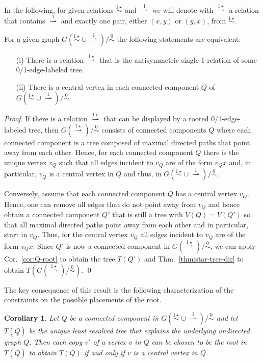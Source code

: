 \documentclass[smallextended]{svjour3}
\newcommand{\Ro}{\mathrel{\overset{0}{\sim}}}
\newcommand{\Rlstar}{\mathrel{\overset{1\star}{\sim}}}
\newcommand{\Rldstar}{\mathrel{\overset{1\star}{\rightharpoonup}}}
\newcommand{\Rld}{\mathrel{\overset{1}{\rightharpoonup}}}
\newtheorem{cor}[thm]{Corollary}
\begin{document}
In the following, for given relations $\Rlstar$ and $\Rld$ we will denote
with $\Rldstar$ a relation that contains $\Rld$ and exactly one pair,
either $(x,y)$ or $(y,x)$, from $\Rlstar$.

\begin{lemma}
  For a given graph $G(\Rlstar\cup\Rld)/\Ro$ the following statements
  are equivalent:
  \begin{itemize}
  \item[(i)] There is a relation $\Rldstar$ that is the antisymmetric
    single-1-relation of some 0/1-edge-labeled tree.
  \item[(ii)] There is a central vertex in each connected component $Q$ of
    $G(\Rlstar\cup\Rld)/\Ro$.
  \end{itemize}
\end{lemma}
\begin{proof}
  If there is a relation $\Rldstar$ that can be displayed by a rooted
  0/1-edge-labeled tree, then $G(\Rldstar)/\Ro$ consists of connected
  components $Q$ where each connected component is a tree composed of
  maximal directed paths that point away from each other. 
  Hence, for each connected component
  $Q$ there is the unique vertex $v_Q$ such that all edges incident to
  $v_Q$ are of the form $v_Qx$ and, in particular, $v_Q$ is a central
  vertex in $Q$ and thus, in $G(\Rlstar\cup\Rld)/\Ro$.

  Conversely, assume that each connected component $Q$ has a central
  vertex $v_Q$. Hence, one can remove all edges that do not point away from
  $v_Q$ and hence obtain a connected component $Q'$ that is still a tree
  with $V(Q)=V(Q')$ so that all maximal directed paths point away from each
  other and in particular, start in $v_Q$.  Thus, for the central vertex
  $v_Q$ all edges incident to $v_Q$ are of the form $v_Qx$. Since $Q'$ is
  now a connected component in $G(\Rldstar)/\Ro$, we can apply Cor.\
  \ref{cor:Q-root} to obtain the tree $T(Q')$ and
  Thm.\ \ref{thm:star-tree-dir} to obtain $T(G(\Rldstar)/\Ro)$. \qed
\end{proof}

The key consequence of this result is the following characterization of the
constraints on the possible placements of the root.

\begin{cor}
  Let $Q$ be a connected component in $G(\Rlstar\cup\Rld)/\Ro$ and let
  $T(\underline{Q})$ be the unique least resolved tree that explains the
  underlying undirected graph $\underline{Q}$.  Then each copy $v'$ of a
  vertex $v$ in $Q$ can be chosen to be the root in $T(\underline{Q})$ to
  obtain $T(Q)$ if and only if $v$ is a central vertex in $Q$.
\end{cor}
\end{document}
